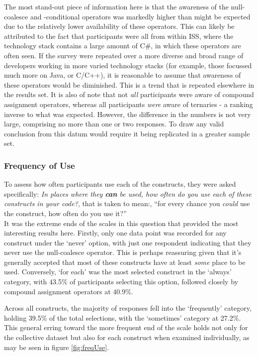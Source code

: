 \documentclass{article}
\begin{document}
            The most stand-out piece of information here is that the awareness of the null-coalesce and -conditional operators was markedly higher than might be expected due to the relatively lower availability of these operators. This can likely be attributed to the fact that participants were all from within ISS, where the  technology stack contains a large amount of C\#, in which these operators are often seen. If the survey were repeated over a more diverse and broad range of developers working in more varied technology stacks (for example, those focussed much more on Java, or C/C++), it is reasonable to assume that awareness of these operators would be diminished. This is a trend that is repeated elsewhere in the results set.
            It is also of note that not \emph{all} participants were aware of compound assignment operators, whereas all participants \emph{were} aware of ternaries - a ranking inverse to what was expected. However, the difference in the numbers is not very large, comprising no more than one or two responses. To draw any valid conclusion from this datum would require it being replicated in a greater sample set.

        \subsubsection{Frequency of Use}
            To assess how often participants use each of the constructs, they were asked specifically: \textit{In places where they \textbf{can} be used, how often do you use each of these constructs in your code?}, that is taken to mean:, ``for every chance you \emph{could} use the construct, how often do you use it?''
            \\\newline
            It was the extreme ends of the scales in this question that provided the most interesting results here. Firstly, only one data point was recorded for any construct under the `never' option, with just one respondent indicating that they never use the null-coalesce operator. This is perhaps reassuring given that it's generally accepted that most of these constructs have at least \emph{some} place to be used. Conversely, `for each' was the most selected construct in the `always' category, with 43.5\% of participants selecting this option, followed closely by compound assignment operators at 40.9\%.

            Across all constructs, the majority of responses fell into the `frequently' category, holding 39.5\% of the total selections, with the `sometimes' category at 27.2\%. This general erring toward the more frequent end of the scale holds not only for the collective dataset but also for each construct when examined individually, as may be seen in figure \ref{fig:freqUse}.
\end{document}
